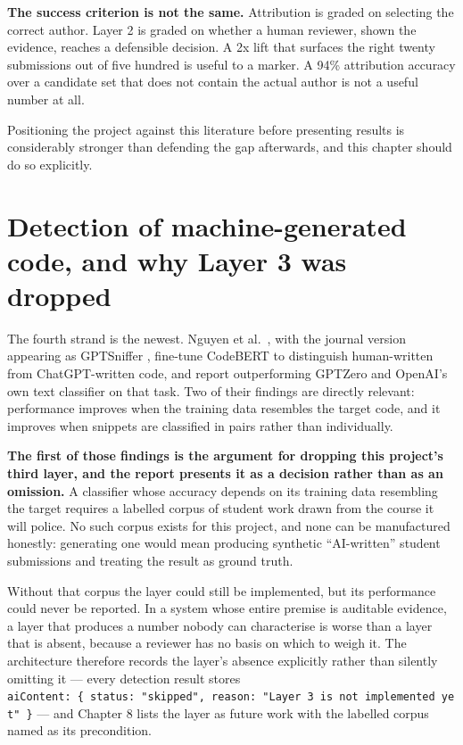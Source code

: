 \textbf{The success criterion is not the same.} Attribution is graded on
selecting the correct author. Layer 2 is graded on whether a human
reviewer, shown the evidence, reaches a defensible decision. A 2x lift
that surfaces the right twenty submissions out of five hundred is useful
to a marker. A 94\% attribution accuracy over a candidate set that does
not contain the actual author is not a useful number at all.

Positioning the project against this literature before presenting
results is considerably stronger than defending the gap afterwards, and
this chapter should do so explicitly.

\hypertarget{detection-of-machine-generated-code-and-why-layer-3-was-dropped}{%
\section{Detection of machine-generated code, and why Layer 3 was
dropped}\label{detection-of-machine-generated-code-and-why-layer-3-was-dropped}}

The fourth strand is the newest. Nguyen et al.~\cite{nguyen2023}, with
the journal version appearing as GPTSniffer \cite{gptsniffer2024},
fine-tune CodeBERT to distinguish human-written from ChatGPT-written
code, and report outperforming GPTZero and OpenAI's own text classifier
on that task. Two of their findings are directly relevant: performance
improves when the training data resembles the target code, and it
improves when snippets are classified in pairs rather than individually.

\textbf{The first of those findings is the argument for dropping this
project's third layer, and the report presents it as a decision rather
than as an omission.} A classifier whose accuracy depends on its
training data resembling the target requires a labelled corpus of
student work drawn from the course it will police. No such corpus exists
for this project, and none can be manufactured honestly: generating one
would mean producing synthetic ``AI-written'' student submissions and
treating the result as ground truth.

Without that corpus the layer could still be implemented, but its
performance could never be reported. In a system whose entire premise is
auditable evidence, a layer that produces a number nobody can
characterise is worse than a layer that is absent, because a reviewer
has no basis on which to weigh it. The architecture therefore records
the layer's absence explicitly rather than silently omitting it ---
every detection result stores
\texttt{aiContent:\ \{\ status:\ "skipped",\ reason:\ "Layer\ 3\ is\ not\ implemented\ yet"\ \}}
--- and Chapter 8 lists the layer as future work with the labelled
corpus named as its precondition.

